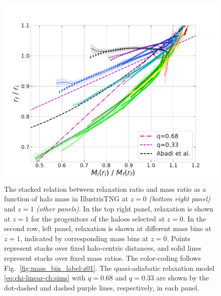 \begin{figure}
\includegraphics[width=0.48\linewidth]{plots/fit_view_M_T_snap098.pdf}
\caption{The stacked relation between relaxation ratio and mass ratio as a function of halo mass in IllustrisTNG at $z=0$ \emph{(bottom right panel)} and $z=1$ \emph{(other panels)}. In the top right panel, relaxation is shown at $z=1$ for the progenitors of the haloes selected at $z=0$. In the second row, left panel, relaxation is shown at different mass bins at $z=1$, indicated by corresponding mass bins at $z=0$. Points represent stacks over fixed halo-centric distances, and solid lines represent stacks over fixed mass ratios. The color-coding follows Fig.~\ref{fig:mass_bin_label-z01}. The quasi-adiabatic relaxation model \eqref{eq:chi-linear-ch:sims} with $q=0.68$ and $q=0.33$ are shown by the dot-dashed and dashed purple lines, respectively, in each panel.}
\label{fig:fit-view-mass-indep}
\end{figure}



